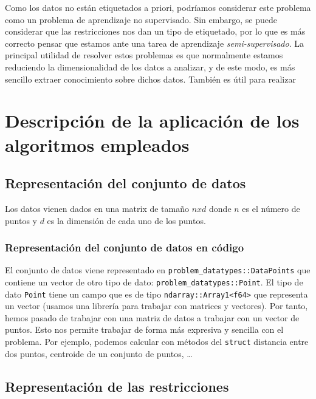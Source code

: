 \documentclass[11pt]{article}
\begin{document}
Como los datos no están etiquetados a priori, podríamos considerar este problema como un problema de aprendizaje no supervisado. Sin embargo, se puede considerar que las restricciones nos dan un tipo de etiquetado, por lo que es más correcto pensar que estamos ante una tarea de aprendizaje \emph{semi-supervisado}. La principal utilidad de resolver estos problemas es que normalmente estamos reduciendo la dimensionalidad de los datos a analizar, y de este modo, es más sencillo extraer conocimiento sobre dichos datos. También es útil para realizar

\pagebreak

\section{Descripción de la aplicación de los algoritmos empleados}

\subsection{Representación del conjunto de datos}

Los datos vienen dados en una matrix de tamaño $n x d$ donde $n$ es el número de puntos y $d$ es la dimensión de cada uno de los puntos.

\subsubsection{Representación del conjunto de datos en código}

El conjunto de datos viene representado en \lstinline{problem_datatypes::DataPoints} que contiene un vector de otro tipo de dato: \lstinline{problem_datatypes::Point}. El tipo de dato \lstinline{Point} tiene un campo que es de tipo \lstinline{ndarray::Array1<f64>} que representa un vector (usamos una librería para trabajar con matrices y vectores). Por tanto, hemos pasado de trabajar con una matriz de datos a trabajar con un vector de puntos. Esto nos permite trabajar de forma más expresiva y sencilla con el problema. Por ejemplo, podemos calcular con métodos del \lstinline{struct} distancia entre dos puntos, centroide de un conjunto de puntos, \ldots

\subsection{Representación de las restricciones}
\end{document}
